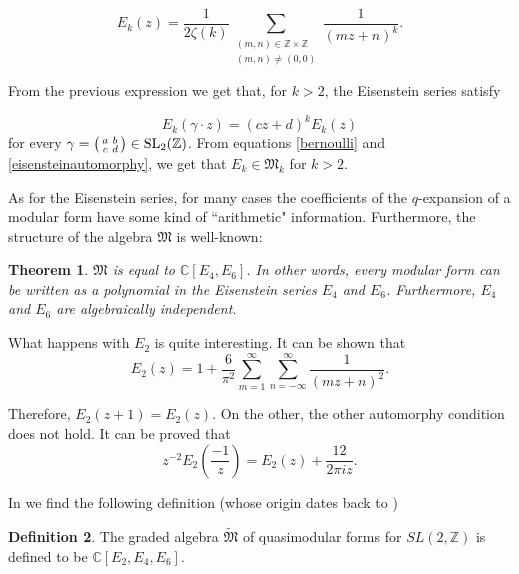 \documentclass{article}
\numberwithin{equation}{section}
\numberwithin{figure}{section}
\theoremstyle{plain}
\newtheorem{theorem}{Theorem}[section]
\theoremstyle{definition}
\newtheorem{definition}[theorem]{Definition}
\numberwithin{equation}{section}
\newtheorem[S, bodystyle=\normalfont\noindent]{defiS}{Definition}[section]
\begin{document}
\begin{equation}
E_k(z)=\frac{1}{2 \zeta(k)}
\sum_{\substack{(m,n)\in \mathbb{Z}\times \mathbb{Z} \\ (m,n)\neq (0,0)}}
\frac{1}{(mz+n)^k}.
\end{equation}


From the previous expression  we get that, for $k>2$, the Eisenstein series satisfy

\begin{equation} \label{eisensteinautomorphy}
E_k(\gamma\cdot z)=(cz+d)^kE_k(z)
\end{equation}for every $\gamma=\begin{psmallmatrix} a & b \\ c & d \end{psmallmatrix}\in \text{SL}_2(\mathbb{Z})$. From equations \eqref{bernoulli} and \eqref{eisensteinautomorphy},  we get that $E_k\in \mathfrak{M}_k$ for $k>2$.




As for the Eisenstein series, for many cases the coefficients of the $q$-expansion of a modular form have some kind of ``arithmetic" information. Furthermore, the structure of the algebra $\mathfrak{M}$ is well-known:

\begin{theorem} $\mathfrak{M} $ is equal to $\mathbb{C}[E_4,E_6]$. In other words, every modular form can be written as a polynomial in the Eisenstein series $E_4$ and $E_6$. Furthermore, $E_4$ and $E_6$ are algebraically independent.
\end{theorem}

\noindent What happens with $E_2$ is quite interesting. It can be shown that 
\begin{equation}
E_2(z)=1+\frac{6}{\pi^2}\sum_{m=1}^{\infty}\sum_{n=-\infty}^{\infty}\frac{1}{(mz+n)^2}.
\end{equation}

    
\noindent Therefore, $E_2(z+1)=E_2(z)$. On the other, the other automorphy condition does not hold. It can be proved that \parencite[First lecture notes, Proposition 6]{123}
\begin{equation}z^{-2}E_2(\frac{-1}{z})=E_2(z)+\frac{12}{2\pi i z}.\end{equation}
    
In \parencite[First lecture notes, \S5.1]{123} we find the following definition (whose origin dates back to \parencite{Kaneko})
    
\begin{definition}
The graded algebra $\tilde{\mathfrak{M}}$ of quasimodular forms for $SL(2,\mathbb{Z})$ is defined to be $\mathbb{C}[E_2,E_4,E_6]$.
\end{definition}
\end{document}
